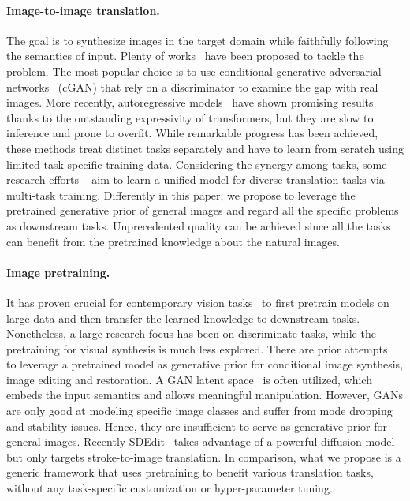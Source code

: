 \paragraph{Image-to-image translation.} The goal is to synthesize images in the target domain while faithfully following the semantics of input. Plenty of works~\cite{pang2021image,liu2020generative} have been proposed to tackle the problem. The most popular choice is to use conditional generative adversarial networks~\cite{isola2017image,zhu2017toward,wang2018high,park2019semantic,choi2018stargan,zhang2020cross,zhou2021cocosnet} (cGAN) that rely on a discriminator to examine the gap with real images. More recently, autoregressive models~\cite{ramesh2021zero,esser2021taming} have shown promising results thanks to the outstanding expressivity of transformers, but they are slow to inference and prone to overfit. While remarkable progress has been achieved, these methods treat distinct tasks separately and have to learn from scratch using limited task-specific training data. Considering the synergy among tasks, some research efforts ~\cite{xia2021tedigan,zhang2021m6,kutuzova2021multimodal,huang2021multimodal,qian2019trinity,chen2021pre,saharia2021palette} aim to learn a unified model for diverse translation tasks via multi-task training. Differently in this paper, we propose to leverage the pretrained generative prior of general images and regard all the specific problems as downstream tasks. Unprecedented quality can be achieved since all the tasks can benefit from the pretrained knowledge about the natural images.

\paragraph{Image pretraining.} It has proven crucial for contemporary vision tasks~\cite{he2021masked,bao2021beit,wei2021masked,baevski2022data2vec,radford2021learning} to first pretrain models on large data and then transfer the learned knowledge to downstream tasks. Nonetheless, a large research focus has been on discriminate tasks, while the pretraining for visual synthesis is much less explored. There are prior attempts~\cite{patashnik2021styleclip,collins2020editing,yang2021gan, wang2021HFGI,wang2021towards,pan2021exploiting,menon2020pulse} to leverage a pretrained model as generative prior for conditional image synthesis, image editing and restoration. A GAN latent space~\cite{brock2018large,karras2019style} is often utilized, which embeds the input semantics and allows meaningful manipulation. However, GANs are only good at modeling specific image classes and suffer from mode dropping and stability issues. Hence, they are insufficient to serve as generative prior for general images. Recently SDEdit~\cite{meng2021sdedit} takes advantage of a powerful diffusion model but only targets stroke-to-image translation. In comparison, what we propose is a generic framework that uses pretraining to benefit various translation tasks, without any task-specific customization or hyper-parameter tuning.

